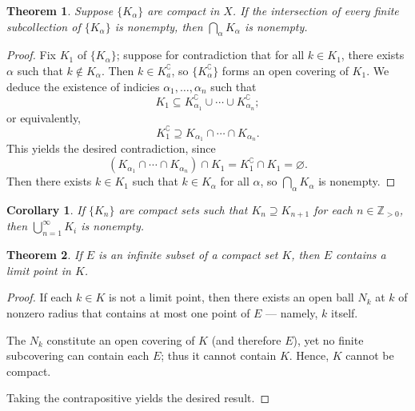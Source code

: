 \documentclass[11pt]{article}
\newtheorem{theorem}{Theorem}
\newtheorem{corollary}{Corollary}
\begin{document}
\begin{theorem}
	Suppose $\{ K_{\alpha} \}$ are compact in $X$. If the intersection of every finite subcollection of $\{ K_{\alpha} \}$ is nonempty, then $\bigcap_{\alpha} K_{\alpha}$ is nonempty.
\end{theorem}
\begin{adjustwidth}{1cm}{}
	\begin{proof}
		Fix $K_{1}$ of $\{ K_{\alpha} \}$; suppose for contradiction that for all $k \in K_{1}$, there exists $\alpha$ such that $k \notin K_{\alpha}$. Then $k \in K_{a}^{\complement}$, so $\{ K_{\alpha}^{\complement} \}$ forms an open covering of $K_{1}$. We deduce the existence of indicies $\alpha_{1}, \ldots, \alpha_{n}$ such that
		\[
			K_{1} \subseteq K_{\alpha_{1}}^{\complement} \cup \cdots \cup K_{\alpha_{n}}^{\complement};
		\]
		or equivalently,
		\[
			K_{1}^{\complement} \supseteq K_{\alpha_{1}} \cap \cdots \cap K_{\alpha_{n}}.
		\]
		This yields the desired contradiction, since
		\[
			(K_{\alpha_{1}} \cap \cdots \cap K_{\alpha_{n}}) \cap K_{1} = K_{1}^{\complement} \cap K_{1} = \varnothing.
		\]
		Then there exists $k \in K_{1}$ such that $k \in K_{\alpha}$ for all $\alpha$, so $\bigcap_{\alpha} K_{\alpha}$ is nonempty.
	\end{proof}
\end{adjustwidth}

\begin{corollary}
	If $\{ K_{n} \}$ are compact sets such that $K_{n} \supseteq K_{n + 1}$ for each $n \in \mathbb{Z}_{> 0}$, then $\bigcup_{n = 1}^{\infty} K_{i}$ is nonempty.
\end{corollary}

\newpage

\begin{theorem}
	If $E$ is an infinite subset of a compact set $K$, then $E$ contains a limit point in $K$.
\end{theorem}
\begin{adjustwidth}{1cm}{}
	\begin{proof}
		If each $k \in K$ is not a limit point, then there exists an open ball $N_{k}$ at $k$ of nonzero radius that contains at most one point of $E$ --- namely, $k$ itself.
		
		The $N_{k}$ constitute an open covering of $K$ (and therefore $E$), yet no finite subcovering can contain each $E$; thus it cannot contain $K$. Hence, $K$ cannot be compact.

		Taking the contrapositive yields the desired result.
	\end{proof}
\end{adjustwidth}
\end{document}
